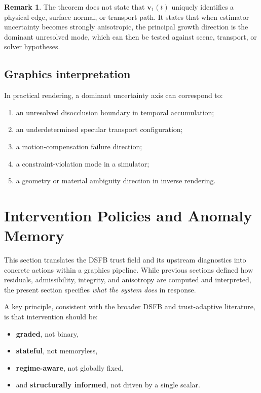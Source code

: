 \documentclass[11pt,letterpaper]{article}
\theoremstyle{gcresult}
\theoremstyle{definition}
\newtheorem{remark}[theorem]{Remark}
\begin{document}
\begin{remark}
The theorem does not state that $\mathbf{v}_1(t)$ uniquely identifies a physical edge, surface normal, or transport path. It states that when estimator uncertainty becomes strongly anisotropic, the principal growth direction is the dominant unresolved mode, which can then be tested against scene, transport, or solver hypotheses.
\end{remark}

\subsection{Graphics interpretation}
In practical rendering, a dominant uncertainty axis can correspond to:
\begin{enumerate}[leftmargin=2em]
    \item an unresolved disocclusion boundary in temporal accumulation;
    \item an underdetermined specular transport configuration;
    \item a motion-compensation failure direction;
    \item a constraint-violation mode in a simulator;
    \item a geometry or material ambiguity direction in inverse rendering.
\end{enumerate}



\section{Intervention Policies and Anomaly Memory}
\label{sec:intervention}

This section translates the DSFB trust field and its upstream diagnostics into concrete actions within a graphics pipeline. While previous sections defined how residuals, admissibility, integrity, and anisotropy are computed and interpreted, the present section specifies \emph{what the system does} in response.

A key principle, consistent with the broader DSFB and trust-adaptive literature, is that intervention should be:
\begin{itemize}[leftmargin=1.5em]
    \item \textbf{graded}, not binary,
    \item \textbf{stateful}, not memoryless,
    \item \textbf{regime-aware}, not globally fixed,
    \item and \textbf{structurally informed}, not driven by a single scalar.
\end{itemize}
\end{document}
